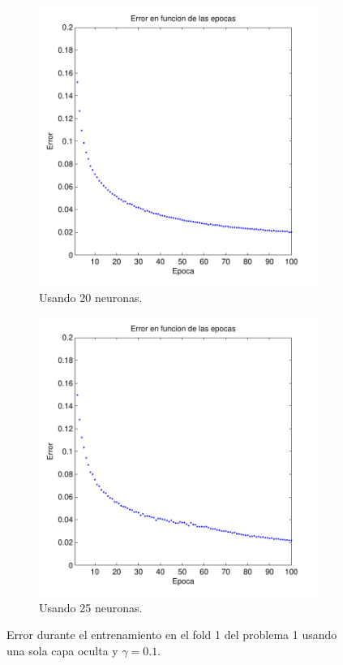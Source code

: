 \documentclass[informe.tex]{subfiles}
\begin{document}
\begin{figure}[H]
\begin{subfigure}[b]{0.32\textwidth}
                \includegraphics[width=\textwidth]{graficos/error_fold1_20_binary_100_01.pdf}
                \caption{Usando 20 neuronas.}
                \label{fig:d1-f1-01-n20}
        \end{subfigure}
        \begin{subfigure}[b]{0.32\textwidth}
                \includegraphics[width=\textwidth]{graficos/error_fold1_25_binary_100_01.pdf}
                \caption{Usando 25 neuronas.}
                \label{fig:d1-f1-01-n25}
        \end{subfigure}
        
        \caption{Error durante el entrenamiento en el fold 1 del problema 1 usando una sola capa oculta y $\gamma=0.1$.}\label{fig:p1-f1-gamma01}
    \end{figure}
    \FloatBarrier
    
\end{document}
